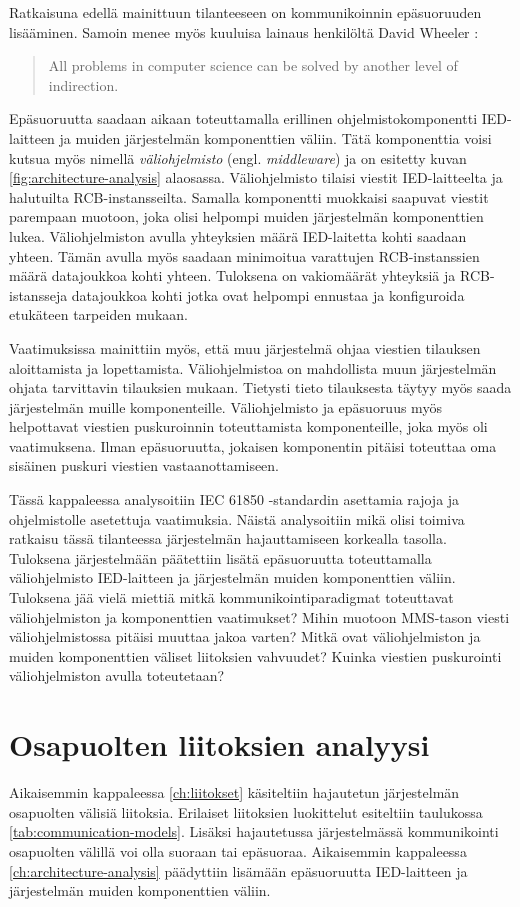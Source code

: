 Ratkaisuna edellä mainittuun tilanteeseen on kommunikoinnin epäsuoruuden lisääminen. Samoin menee myös kuuluisa lainaus henkilöltä David Wheeler \cite[s.~290]{beautiful-code}:
\begin{quote}
	All problems in computer science can be solved by another level of indirection.
\end{quote}
Epäsuoruutta saadaan aikaan toteuttamalla erillinen ohjelmistokomponentti IED-laitteen ja muiden järjestelmän komponenttien väliin. Tätä komponenttia voisi kutsua myös nimellä \emph{väliohjelmisto} (engl. \emph{middleware}) ja on esitetty kuvan \ref{fig:architecture-analysis} alaosassa. Väliohjelmisto tilaisi viestit IED-laitteelta ja halutuilta RCB-instansseilta. Samalla komponentti muokkaisi saapuvat viestit parempaan muotoon, joka olisi helpompi muiden järjestelmän komponenttien lukea. Väliohjelmiston avulla yhteyksien määrä IED-laitetta kohti saadaan yhteen. Tämän avulla myös saadaan minimoitua varattujen RCB-instanssien määrä datajoukkoa kohti yhteen. Tuloksena on vakiomäärät yhteyksiä ja RCB-istansseja datajoukkoa kohti jotka ovat helpompi ennustaa ja konfiguroida etukäteen tarpeiden mukaan.

Vaatimuksissa mainittiin myös, että muu järjestelmä ohjaa viestien tilauksen aloittamista ja lopettamista. Väliohjelmistoa on mahdollista muun järjestelmän ohjata tarvittavin tilauksien mukaan. Tietysti tieto tilauksesta täytyy myös saada järjestelmän muille komponenteille. Väliohjelmisto ja epäsuoruus myös helpottavat viestien puskuroinnin toteuttamista komponenteille, joka myös oli vaatimuksena. Ilman epäsuoruutta, jokaisen komponentin pitäisi toteuttaa oma sisäinen puskuri viestien vastaanottamiseen.

Tässä kappaleessa analysoitiin IEC 61850 -standardin asettamia rajoja ja ohjelmistolle asetettuja vaatimuksia. Näistä analysoitiin mikä olisi toimiva ratkaisu tässä tilanteessa järjestelmän hajauttamiseen korkealla tasolla. Tuloksena järjestelmään päätettiin lisätä epäsuoruutta toteuttamalla väliohjelmisto IED-laitteen ja järjestelmän muiden komponenttien väliin. Tuloksena jää vielä miettiä mitkä kommunikointiparadigmat toteuttavat väliohjelmiston ja komponenttien vaatimukset? Mihin muotoon MMS-tason viesti väliohjelmistossa pitäisi muuttaa jakoa varten? Mitkä ovat väliohjelmiston ja muiden komponenttien väliset liitoksien vahvuudet? Kuinka viestien puskurointi väliohjelmiston avulla toteutetaan?


\section{Osapuolten liitoksien analyysi}
Aikaisemmin kappaleessa \ref{ch:liitokset} käsiteltiin hajautetun järjestelmän osapuolten välisiä liitoksia. Erilaiset liitoksien luokittelut esiteltiin taulukossa \ref{tab:communication-models}. Lisäksi hajautetussa järjestelmässä kommunikointi osapuolten välillä voi olla suoraan tai epäsuoraa. Aikaisemmin kappaleessa \ref{ch:architecture-analysis} päädyttiin lisämään epäsuoruutta IED-laitteen ja järjestelmän muiden komponenttien väliin.

